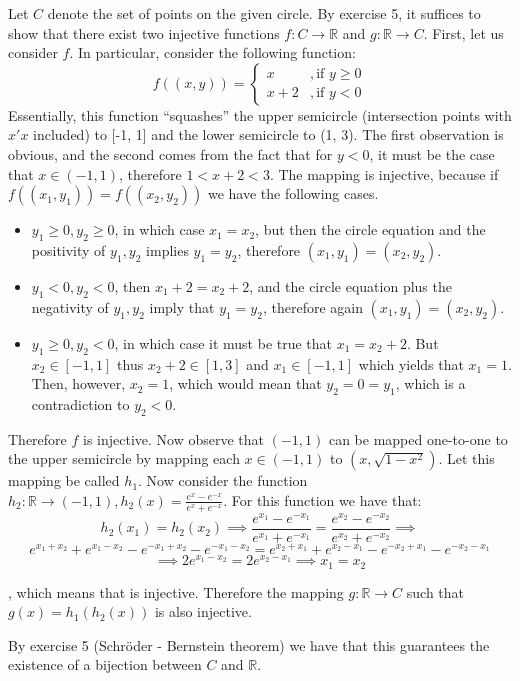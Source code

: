\begin{solution}

    Let $C$ denote the set of points on the given circle. By exercise 5, it suffices to show that there exist two injective functions $f:C \rightarrow \mathbb{R}$ and $g: \mathbb{R} \rightarrow C$. First, let us consider $f$. In particular, consider the following function:
    $$f((x,y)) =  \begin{cases} 
      x &, \text{if $y \geq 0$} \\
      x + 2 &, \text{if $y < 0$}
   \end{cases}$$
   Essentially, this function ``squashes'' the upper semicircle (intersection points with $x'x$ included) to [-1, 1] and the lower semicircle to (1, 3). The first observation is obvious, and the second comes from the fact that for $y<0$, it must be the case that $x \in (-1, 1)$, therefore $1 < x+2 < 3$. The mapping is injective, because if $f((x_1, y_1)) = f((x_2, y_2))$ we have the following cases.
   \begin{itemize}
       \item $y_1 \geq 0, y_2 \geq 0$, in which case $x_1 = x_2$, but then the circle equation and the positivity of $y_1, y_2$ implies $y_1 = y_2$, therefore $(x_1, y_1) = (x_2, y_2)$.
       \item $y_1 < 0, y_2 < 0$, then $x_1 + 2 = x_2 +2$, and the circle equation plus the negativity of $y_1, y_2$ imply that $y_1 = y_2$, therefore again $(x_1, y_1) = (x_2, y_2)$.
       \item  $y_1 \geq 0, y_2 < 0$, in which case it must be true that $x_1 = x_2+2$. But $x_2 \in [-1, 1]$ thus $x_2 + 2 \in [1, 3]$ and $x_1 \in [-1, 1]$ which yields that $x_1 = 1$. Then, however, $x_2 = 1$, which would mean that $y_2 = 0 = y_1$, which is a contradiction to $y_2 < 0$.
   \end{itemize}
   Therefore $f$ is injective.
   Now observe that $(-1, 1)$ can be mapped one-to-one to the upper semicircle by mapping each $x \in (-1, 1)$ to $(x, \sqrt{1-x^2})$. Let this mapping be called $h_1$. Now consider the function $h_2: \mathbb{R} \rightarrow (-1, 1), h_2(x) = \frac{e^{x}-e^{-x}}{e^x+e^{-x}}$. For this function we have that:
   $$h_2(x_1) = h_2(x_2) \implies \frac{e^{x_1}-e^{-x_1}}{e^{x_1}+e^{-x_1}} = \frac{e^{x_2} - e^{-x_2}}{e^{x_2}+e^{-x_2}} \implies $$
   $$e^{x_1+x_2}+e^{x_1-x_2}-e^{-x_1+x_2}-e^{-x_1-x_2} = e^{x_2+x_1}+e^{x_2-x_1} - e^{-x_2+x_1} - e^{-x_2-x_1}$$
   $$\implies 2e^{x_1-x_2} = 2e^{x_2-x_1} \implies x_1 = x_2$$

   , which means that is injective. Therefore the mapping $g: \mathbb{R} \rightarrow C$ such that $g(x) = h_1(h_2(x))$ is also injective.

   By exercise 5 (Schröder - Bernstein theorem) we have that this guarantees the existence of a bijection between $C$ and $\mathbb{R}$.
\end{solution}

